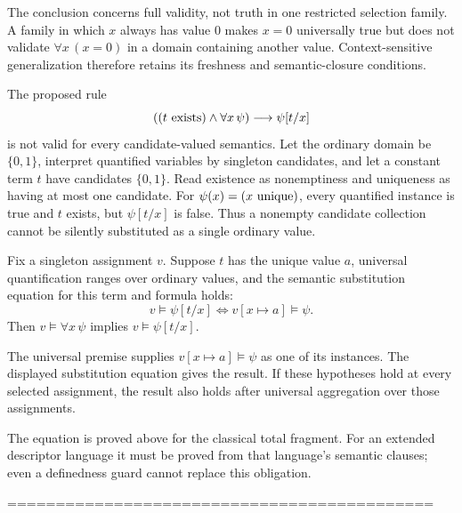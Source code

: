 The conclusion concerns full validity, not truth in one restricted
selection family. A family in which $x$ always has value $0$ makes
$x=0$ universally true but does not validate $\forall x\,(x=0)$ in
a domain containing another value. Context-sensitive generalization
therefore retains its freshness and semantic-closure conditions.

\begin{example}
The proposed rule
\[
((t\mathrm{\ exists})\land\forall x\,\psi)\longrightarrow\psi[t/x]
\]
is not valid for every candidate-valued semantics. Let the ordinary domain
be $\{0,1\}$, interpret quantified variables by singleton candidates, and
let a constant term $t$ have candidates $\{0,1\}$. Read existence as
nonemptiness and uniqueness as having at most one candidate. For
$\psi(x)=(x\mathrm{\ unique})$, every quantified instance is true and $t$ exists,
but $\psi[t/x]$ is false. Thus a nonempty candidate collection cannot
be silently substituted as a single ordinary value.
\end{example}

\begin{proposition}
Fix a singleton assignment $v$. Suppose $t$ has the unique value $a$,
universal quantification ranges over ordinary values, and the semantic
substitution equation for this term and formula holds:
\[
v\models\psi[t/x]\iff v[x\mapsto a]\models\psi.
\]
Then $v\models\forall x\,\psi$ implies $v\models\psi[t/x]$.
\end{proposition}
\Proof
The universal premise supplies $v[x\mapsto a]\models\psi$ as one
of its instances. The displayed substitution equation gives the result.
If these hypotheses hold at every selected assignment, the result also
holds after universal aggregation over those assignments.
\Done

The equation is proved above for the classical total fragment. For an
extended descriptor language it must be proved from that language's
semantic clauses; even a definedness guard cannot replace this obligation.


\iffalse
============================================\\
